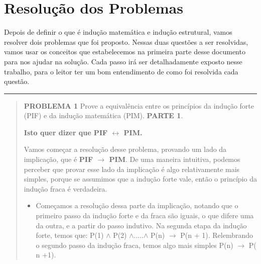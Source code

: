 \documentclass[a4paper, 10pt]{article}
\begin{document}
\section{Resolução dos Problemas}
Depois de definir o que é indução matemática e indução estrutural, vamos resolver dois problemas que foi proposto. Nessas duas questões a ser resolvidas, vamos usar os conceitos que estabelecemos na primeira parte desse documento para nos ajudar na solução. Cada passo irá ser detalhadamente exposto nesse trabalho, para o leitor ter um bom entendimento de como foi resolvida cada questão.
\hrule
\begin{quote}
  \textbf{PROBLEMA 1}
        Prove a equivalência entre os princípios da indução forte (PIF) e da indução matemática (PIM).
        \newline
        \textbf{PARTE 1}.
        
        
        \textbf{Isto quer dizer que PIF $\leftrightarrow$ PIM.}
       
       
        Vamos começar a resolução desse problema, provando um lado da implicação, que é \textbf{PIF $\to$ PIM}. De uma maneira intuitiva, podemos perceber que provar esse lado da implicação é algo relativamente mais simples, porque se assumimos que a indução forte vale, então o princípio da indução fraca é verdadeira.
        \begin{itemize}
            \item Começamos a resolução dessa parte da implicação, notando que o primeiro passo da indução forte e da fraca são iguais, o que difere uma da outra, e a partir do passo indutivo. Na segunda etapa da indução forte, temos que: P(1) $\wedge$ P(2) $\wedge$.....$\wedge$ P(n) $\to$ P(n + 1). Relembrando o segundo passo da indução fraca, temos algo mais simples P(n) $\to$ P( n +1).
            

\end{itemize}
\end{quote}
\end{document}

